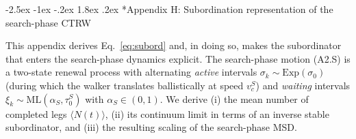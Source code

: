 \documentclass[11pt,a4paper]{article}
\makeatletter
\renewcommand\section{\@startsection{section}{1}{\z@}%
  {-2.5ex \@plus -1ex \@minus -.2ex}%
  {1.8ex \@plus.2ex}%
  {\normalfont\normalsize\bfseries\centering}}
\makeatother
\begin{document}
\section*{Appendix H: Subordination representation of the
search-phase CTRW}
\label{app:subord}

This appendix derives Eq.~\eqref{eq:subord} and, in doing so,
makes the subordinator that enters the search-phase dynamics
explicit. The search-phase motion (A2.S) is a two-state renewal
process with alternating \emph{active} intervals
$\sigma_k\sim\mathrm{Exp}(\sigma_0)$ (during which the walker
translates ballistically at speed $v_c^S$) and \emph{waiting}
intervals $\xi_k\sim\mathrm{ML}(\alpha_S,\tau_0^S)$ with
$\alpha_S\in(0,1)$. We derive (i) the mean number of completed
legs $\langle N(t)\rangle$, (ii) its continuum limit in terms of
an inverse stable subordinator, and (iii) the resulting scaling
of the search-phase MSD.
\end{document}
